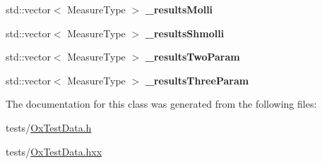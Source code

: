 \begin{DoxyCompactItemize}
\item 
std\+::vector$<$ Measure\+Type $>$ {\bfseries \+\_\+results\+Molli}\hypertarget{class_ox_1_1_test_data_a91ae0ccd1b9dea3b83bfc4d7c300dbb0}{}\label{class_ox_1_1_test_data_a91ae0ccd1b9dea3b83bfc4d7c300dbb0}

\item 
std\+::vector$<$ Measure\+Type $>$ {\bfseries \+\_\+results\+Shmolli}\hypertarget{class_ox_1_1_test_data_ac549cebd93bd96747a68e3680442adfd}{}\label{class_ox_1_1_test_data_ac549cebd93bd96747a68e3680442adfd}

\item 
std\+::vector$<$ Measure\+Type $>$ {\bfseries \+\_\+results\+Two\+Param}\hypertarget{class_ox_1_1_test_data_a456aab7444f11ea99dd64a153e4b009c}{}\label{class_ox_1_1_test_data_a456aab7444f11ea99dd64a153e4b009c}

\item 
std\+::vector$<$ Measure\+Type $>$ {\bfseries \+\_\+results\+Three\+Param}\hypertarget{class_ox_1_1_test_data_aeaaf28f493e2add7c05a2418b5ed993d}{}\label{class_ox_1_1_test_data_aeaaf28f493e2add7c05a2418b5ed993d}

\end{DoxyCompactItemize}


The documentation for this class was generated from the following files\+:\begin{DoxyCompactItemize}
\item 
tests/\hyperlink{_ox_test_data_8h}{Ox\+Test\+Data.\+h}\item 
tests/\hyperlink{_ox_test_data_8hxx}{Ox\+Test\+Data.\+hxx}\end{DoxyCompactItemize}
